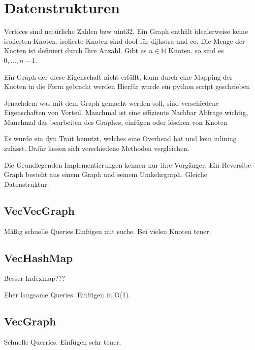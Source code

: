 
\section{Datenstrukturen}

Vertices sind natürliche Zahlen bzw uint32.
Ein Graph enthält idealerweise keine isolierten Knoten.
isolierte Knoten sind doof für dijkstra und co.
Die Menge der Knoten ist definiert durch Ihre Anzahl.
Gibt es $n \in \mathbb{N}$ Knoten, so sind es $0, \dotsc, n - 1$.

Ein Graph der diese Eigenschaft nicht erfüllt, kann durch eine Mapping der Knoten in die Form gebracht werden
Hierfür wurde ein python script geschrieben

Jenachdem was mit dem Graph gemacht werden soll, sind verschiedene Eigenschaften von Vorteil.
Manchmal ist eine effiziente Nachbar Abfrage wichtig,
Manchmal das bearbeiten des Graphes, einfügen oder löschen von Knoten

Es wurde ein dyn Trait benutzt, welches eine Overhead hat und kein inlining zulässt.
Dafür lassen sich verschiedene Methoden vergleichen.

Die Grundlegenden Implementierungen kennen nur ihre Vorgänger.
Ein Reversibe Graph besteht aus einem Graph und seinem Umkehrgraph.
Gleiche Datenstruktur.

\subsection{VecVecGraph}
Mäßig schnelle Queries
Einfügen mit suche.
Bei vielen Knoten teuer.

\subsection{VecHashMap}
Besser Indexmap???

Eher langsame Queries.
Einfügen in O(1).

\subsection{VecGraph}
Schnelle Querries.
Einfügen sehr teuer.

